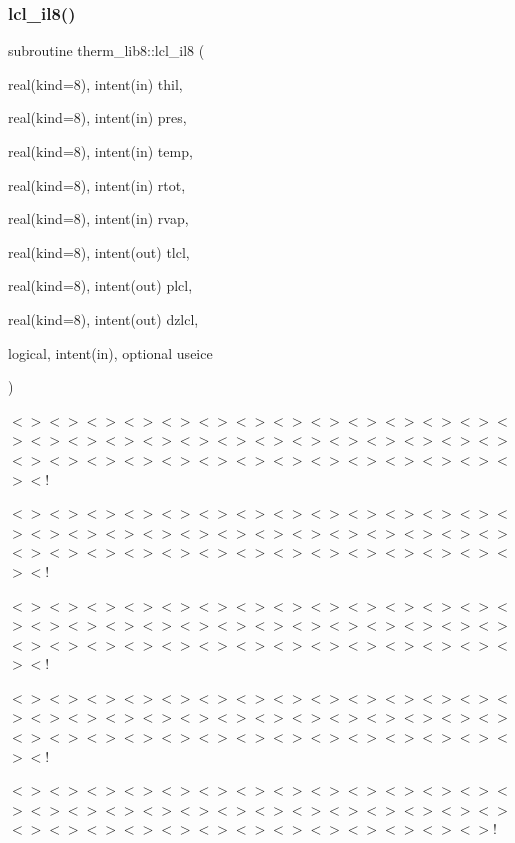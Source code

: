 \subsubsection{\texorpdfstring{lcl\+\_\+il8()}{lcl\_il8()}}
{\footnotesize\ttfamily subroutine therm\+\_\+lib8\+::lcl\+\_\+il8 (\begin{DoxyParamCaption}\item[{real(kind=8), intent(in)}]{thil,  }\item[{real(kind=8), intent(in)}]{pres,  }\item[{real(kind=8), intent(in)}]{temp,  }\item[{real(kind=8), intent(in)}]{rtot,  }\item[{real(kind=8), intent(in)}]{rvap,  }\item[{real(kind=8), intent(out)}]{tlcl,  }\item[{real(kind=8), intent(out)}]{plcl,  }\item[{real(kind=8), intent(out)}]{dzlcl,  }\item[{logical, intent(in), optional}]{useice }\end{DoxyParamCaption})}

$<$$>$$<$$>$$<$$>$$<$$>$$<$$>$$<$$>$$<$$>$$<$$>$$<$$>$$<$$>$$<$$>$$<$$>$$<$$>$$<$$>$$<$$>$$<$$>$$<$$>$$<$$>$$<$$>$$<$$>$$<$$>$$<$$>$$<$$>$$<$$>$$<$$>$$<$$>$$<$$>$$<$$>$$<$$>$$<$$>$$<$$>$$<$$>$$<$$>$$<$$>$$<$$>$$<$$>$$<$$>$$<$$>$$<$$>$$<$$>$$<$$>$$<$!

$<$$>$$<$$>$$<$$>$$<$$>$$<$$>$$<$$>$$<$$>$$<$$>$$<$$>$$<$$>$$<$$>$$<$$>$$<$$>$$<$$>$$<$$>$$<$$>$$<$$>$$<$$>$$<$$>$$<$$>$$<$$>$$<$$>$$<$$>$$<$$>$$<$$>$$<$$>$$<$$>$$<$$>$$<$$>$$<$$>$$<$$>$$<$$>$$<$$>$$<$$>$$<$$>$$<$$>$$<$$>$$<$$>$$<$$>$$<$$>$$<$$>$$<$!

$<$$>$$<$$>$$<$$>$$<$$>$$<$$>$$<$$>$$<$$>$$<$$>$$<$$>$$<$$>$$<$$>$$<$$>$$<$$>$$<$$>$$<$$>$$<$$>$$<$$>$$<$$>$$<$$>$$<$$>$$<$$>$$<$$>$$<$$>$$<$$>$$<$$>$$<$$>$$<$$>$$<$$>$$<$$>$$<$$>$$<$$>$$<$$>$$<$$>$$<$$>$$<$$>$$<$$>$$<$$>$$<$$>$$<$$>$$<$$>$$<$$>$$<$!

$<$$>$$<$$>$$<$$>$$<$$>$$<$$>$$<$$>$$<$$>$$<$$>$$<$$>$$<$$>$$<$$>$$<$$>$$<$$>$$<$$>$$<$$>$$<$$>$$<$$>$$<$$>$$<$$>$$<$$>$$<$$>$$<$$>$$<$$>$$<$$>$$<$$>$$<$$>$$<$$>$$<$$>$$<$$>$$<$$>$$<$$>$$<$$>$$<$$>$$<$$>$$<$$>$$<$$>$$<$$>$$<$$>$$<$$>$$<$$>$$<$$>$$<$!

$<$$>$$<$$>$$<$$>$$<$$>$$<$$>$$<$$>$$<$$>$$<$$>$$<$$>$$<$$>$$<$$>$$<$$>$$<$$>$$<$$>$$<$$>$$<$$>$$<$$>$$<$$>$$<$$>$$<$$>$$<$$>$$<$$>$$<$$>$$<$$>$$<$$>$$<$$>$$<$$>$$<$$>$$<$$>$$<$$>$$<$$>$$<$$>$$<$$>$$<$$>$$<$$>$$<$$>$$<$$>$$<$$>$$<$$>$$<$$>$!

